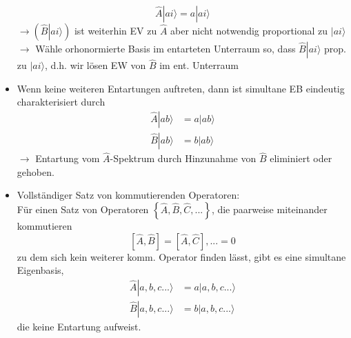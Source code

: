 \documentclass[10pt,article,colorback,accentcolor=tud9d]{scrartcl}
\begin{document}
\begin{fleqn}
\begin{itemize}
      \begin{equation}
      \hat{A}\left.\right|ai\rangle =a\left.\right|ai\rangle
      \end{equation}
      $\rightarrow \left(\hat{B}\left.\right|ai\rangle\right)$ ist weiterhin EV zu $\hat{A}$ aber nicht notwendig proportional zu $\left.\right|ai\rangle$\\
      $\rightarrow$ Wähle orhonormierte Basis im entarteten Unterraum so, dass $\hat{B}\left.\right|ai\rangle$ prop. zu $\left.\right|ai\rangle$, d.h. wir lösen EW von $\hat{B}$ im ent. Unterraum
    \item Wenn keine weiteren Entartungen auftreten, dann ist simultane EB eindeutig charakterisiert durch 
      \begin{equation}
      \begin{aligned}
        \hat{A}\left.\right|ab\rangle&=a\left.\right|ab\rangle\\
        \hat{B}\left.\right|ab\rangle&=b\left.\right|ab\rangle
      \end{aligned}
      \end{equation}
      $\rightarrow$ Entartung vom $\hat{A}$-Spektrum durch Hinzunahme von $\hat{B}$ eliminiert oder gehoben.
    \item Vollständiger Satz von kommutierenden Operatoren:\\
      Für einen Satz von Operatoren $\left\{\hat{A},\hat{B},\hat{C},...\right\}$, die paarweise miteinander kommutieren
      \begin{equation}
      \left[\hat{A},\hat{B}\right]=\left[\hat{A},\hat{C}\right],...=0
      \end{equation}
      zu dem sich kein weiterer komm. Operator finden lässt, gibt es eine simultane Eigenbasis, 
      \begin{equation}
      \begin{aligned}
        \hat{A}\left.\right|a,b,c...\rangle&=a\left.\right|a,b,c...\rangle\\
        \hat{B}\left.\right|a,b,c...\rangle&=b\left.\right|a,b,c...\rangle
      \end{aligned}
      \end{equation}
      die keine Entartung aufweist.
  \end{itemize}
\end{fleqn}
\end{document}
